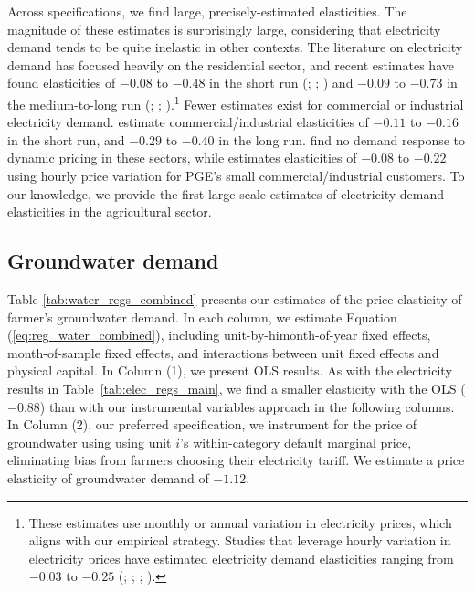 Across specifications, we find large, precisely-estimated elasticities. The magnitude of these estimates is surprisingly large, considering that electricity demand tends to be quite inelastic in other contexts.
The literature on electricity demand has focused heavily on the residential sector, and recent estimates have found elasticities of $-0.08$ to $-0.48$ in the short run (\textcite{reiss2005}; \textcite{alberini2011}; \textcite{fell2014}) and $-0.09$ to $-0.73$ in the medium-to-long run (\textcite{alberini2011}; \textcite{ito2014}; \textcite{deryugina2018}).\footnote{
These estimates use monthly or annual variation in electricity prices, which aligns with our empirical strategy. Studies that leverage hourly variation in electricity prices have estimated electricity demand elasticities ranging from $-0.03$ to $-0.25$ (\textcite{wolak2011}; \textcite{jessoe2014}; \textcite{fowlie2018}; \textcite{ito2018}).} 
Fewer estimates exist for commercial or industrial electricity demand. \textcite{paul2009} estimate commercial/industrial elasticities of $-0.11$ to $-0.16$ in the short run, and $-0.29$ to $-0.40$ in the long run. \textcite{jessoe2015} find no demand response to dynamic pricing in these sectors, while \textcite{blonz2016} estimates elasticities of $-0.08$ to $-0.22$ using hourly price variation for PGE's small commercial/industrial customers.
To our knowledge, we provide the first large-scale estimates of electricity demand elasticities in the agricultural sector.


\subsection{Groundwater demand}
Table \ref{tab:water_regs_combined} presents our estimates of the price elasticity of farmer's groundwater demand. In each column, we estimate Equation (\ref{eq:reg_water_combined}), including unit-by-himonth-of-year fixed effects, month-of-sample fixed effects, and interactions between unit fixed effects and physical capital. In Column (1), we present OLS results. As with the electricity results in Table~\ref{tab:elec_regs_main}, we find a smaller elasticity with the OLS ($-0.88$) than with our instrumental variables approach in the following columns. 
In Column (2), our preferred specification, we instrument for the price of groundwater using  using unit $i$'s within-category default marginal price, eliminating bias from farmers choosing their electricity tariff. We estimate a price elasticity of groundwater demand of $-1.12$. 

